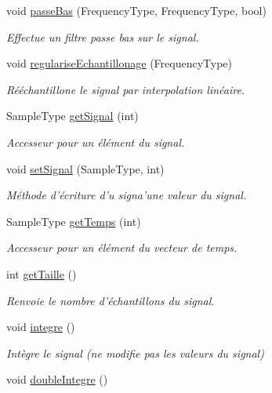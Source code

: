 \begin{DoxyCompactItemize}
\item 
void \hyperlink{class_signal_a151dc6c717029e392f246d4d55fa895b}{passe\-Bas} (Frequency\-Type, Frequency\-Type, bool)
\begin{DoxyCompactList}\small\item\em Effectue un filtre passe bas sur le signal. \end{DoxyCompactList}\item 
void \hyperlink{class_signal_ab9d50c6b05a4632d1773efc4ed1b018a}{regularise\-Echantillonage} (Frequency\-Type)
\begin{DoxyCompactList}\small\item\em Rééchantillone le signal par interpolation linéaire. \end{DoxyCompactList}\item 
Sample\-Type \hyperlink{class_signal_a5191f410a06237266e0ed68a9aea52bf}{get\-Signal} (int)
\begin{DoxyCompactList}\small\item\em Accesseur pour un élément du signal. \end{DoxyCompactList}\item 
void \hyperlink{class_signal_a602184787c1afbeacb31b62507a96820}{set\-Signal} (Sample\-Type, int)
\begin{DoxyCompactList}\small\item\em Méthode d'écriture d'u signa'une valeur du signal. \end{DoxyCompactList}\item 
Sample\-Type \hyperlink{class_signal_ab61493ff9d47090d1f47455223bea0cd}{get\-Temps} (int)
\begin{DoxyCompactList}\small\item\em Accesseur pour un élément du vecteur de temps. \end{DoxyCompactList}\item 
int \hyperlink{class_signal_ae8479776ef4c70c895c5ade8b0071528}{get\-Taille} ()
\begin{DoxyCompactList}\small\item\em Renvoie le nombre d'échantillons du signal. \end{DoxyCompactList}\item 
\hypertarget{class_signal_a0ece1bae5423b833c8e1c379a2c7eda4}{void \hyperlink{class_signal_a0ece1bae5423b833c8e1c379a2c7eda4}{integre} ()}\label{class_signal_a0ece1bae5423b833c8e1c379a2c7eda4}

\begin{DoxyCompactList}\small\item\em Intègre le signal (ne modifie pas les valeurs du signal) \end{DoxyCompactList}\item 
\hypertarget{class_signal_a20b042d70735cbb05ea6ac2954b2a85d}{void \hyperlink{class_signal_a20b042d70735cbb05ea6ac2954b2a85d}{double\-Integre} ()}\label{class_signal_a20b042d70735cbb05ea6ac2954b2a85d}


\end{DoxyCompactItemize}
